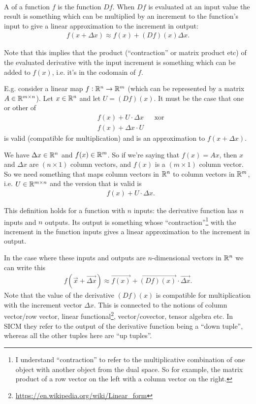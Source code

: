 \begin{definition*}~\\
  A  of a function $f$ is the function $D f$. When $D f$ is evaluated
  at an input value the result is something which can be multiplied by an increment to the
  function's input to give a linear approximation to the increment in output:
  \begin{align*}
    f(x + \Delta x) \approx f(x) + (D f)(x)\Delta x.
  \end{align*}

  Note that this implies that the product (``contraction'' or matrix product etc) of the evaluated
  derivative with the input increment is something which can be added to $f(x)$, i.e. it's in
  the codomain of $f$.

  E.g. consider a linear map $f:\mathbb{R}^n \to \mathbb{R}^m$ (which can be represented by a matrix
  $A \in \mathbb{R}^{m \times n}$). Let $x \in \mathbb{R}^n$ and let $U = (D f)(x)$. It must be the case that one or
  other of
  \begin{align*}
    &f(x) + U \cdot \Delta x ~~~~~~~\text{xor} \\
    &f(x) + \Delta x \cdot U
  \end{align*}
  is valid (compatible for multiplication) and is an approximation to $f(x + \Delta x)$.

  We have $\Delta x \in \mathbb{R}^n$ and $f(x) \in \mathbb{R}^m$. So if we're saying that $f(x) = Ax$, then $x$
  and $\Delta x$ are $(n \times 1)$ column vectors, and $f(x)$ is a $(m \times 1)$ column
  vector. So we need something that maps column vectors in $\mathbb{R}^n$ to column vectors in $\mathbb{R}^m$,
  i.e.  $U \in \mathbb{R}^{m \times n}$ and the version that is valid is
  \begin{align*}
    &f(x) + U \cdot \Delta x.
  \end{align*}

  This definition holds for a function with $n$ inputs: the derivative function has $n$
  inputs and $n$ outputs. Its output is something whose ``contraction''\footnote{I understand
    ``contraction'' to refer to the multiplicative combination of one object with another object from
    the dual space. So for example, the matrix product of a row vector on the left with a column
    vector on the right.} with the increment in the function inputs gives a linear approximation to
  the increment in output.

  In the case where these inputs and outputs are $n$-dimensional vectors in $\mathbb{R}^n$ we can write this
  \begin{align*}
    f(\overrightarrow{x} + \overrightarrow{\Delta x}) \approx \overrightarrow{f(x)} + \overrightarrow{(D f)(x)} \cdot \overrightarrow{\Delta x}.
  \end{align*}
  Note that the value of the derivative $(D f)(x)$ is compatible for multiplication with the
  increment vector $\Delta x$. This is connected to the notions of column vector/row vector, linear
  functional\footnote{\url{https://en.wikipedia.org/wiki/Linear_form}}, vector/covector, tensor
  algebra etc. In SICM they refer to the output of the derivative function being a ``down tuple'',
  whereas all the other tuples here are ``up tuples''.


\end{definition*}
